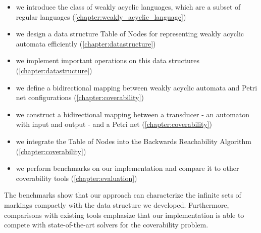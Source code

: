 \begin{itemize}[-]
\setlength\itemsep{0.2em}
\item we introduce the class of weakly acyclic languages, which are a subset of regular languages (\autoref{chapter:weakly_acyclic_language})
\item we design a data structure Table of Nodes for representing weakly acyclic automata efficiently (\autoref{chapter:datastructure})
\item we implement important operations on this data structures (\autoref{chapter:datastructure})
\item we define a bidirectional mapping between weakly acyclic automata and Petri net configurations (\autoref{chapter:coverability})
\item we construct a bidirectional mapping between a transducer - an automaton with input and output - and a Petri net (\autoref{chapter:coverability})
\item we integrate the Table of Nodes into the Backwards Reachability Algorithm (\autoref{chapter:coverability})
\item we perform benchmarks on our implementation and compare it to other coverability tools (\autoref{chapter:evaluation})
\end{itemize}

The benchmarks show that our approach can characterize the infinite sets of markings compactly with the data structure we developed. Furthermore, comparisons with existing tools emphasize that our implementation is able to compete with state-of-the-art solvers for the coverability problem.